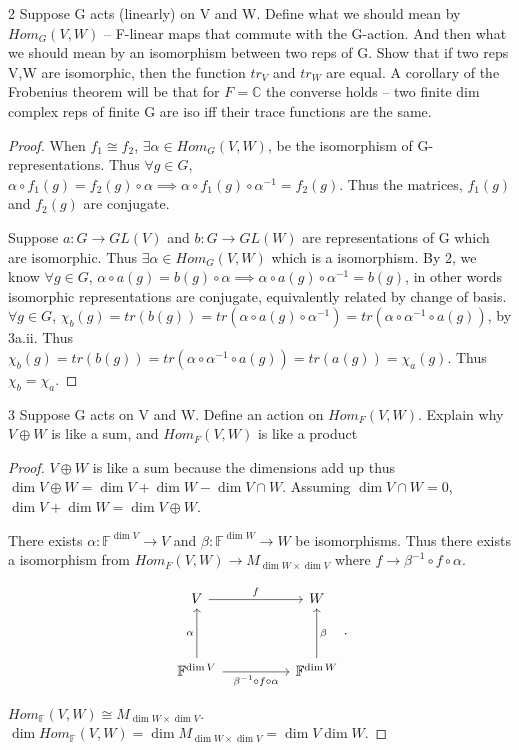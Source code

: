 \documentclass{article}
\newcommand{\C}{\mathbb{C}}
\newcommand{\F}{\mathbb{F}}
\begin{document}
\bigskip

\begin{PROB}{2}\label{Problem 2.}
    Suppose G acts (linearly) on V and W. Define what we should mean by $Hom_G(V,W)$ -- F-linear maps that commute with the G-action. And then what we should mean by an isomorphism between two reps of G. Show that if two reps V,W are isomorphic, then the function $tr_V$ and $tr_W$ are equal.  A corollary of the Frobenius theorem will be that for $F =\C$ the converse holds -- two finite dim complex reps of finite G are iso iff their trace functions are the same. 
\end{PROB}
\begin{proof}
    When $f_1 \cong f_2$,  $\exists \alpha \in Hom_G(V, W)$, be the isomorphism of G-representations. Thus $\forall g \in G$, $\alpha \circ f_1(g) = f_2(g) \circ \alpha \implies \alpha \circ f_1(g) \circ \alpha^{-1} = f_2(g)$. Thus the matrices, $f_1(g)$ and $f_2(g)$ are conjugate.

    Suppose $a: G \to GL(V)$ and $b: G \to GL(W)$ are representations of G which are isomorphic. Thus $\exists \alpha \in Hom_G(V, W)$ which is a isomorphism. By 2, we know $\forall g \in G$, $\alpha \circ a(g) = b(g) \circ \alpha \implies \alpha \circ a(g) \circ \alpha^{-1} = b(g)$, in other words isomorphic representations are conjugate, equivalently related by change of basis. $\forall g \in G$, $\chi_b(g) = tr(b(g)) = tr(\alpha \circ a(g) \circ \alpha^{-1})= tr(\alpha \circ \alpha^{-1} \circ a(g))$, by 3a.ii. Thus $\chi_b(g) =tr(b(g))= tr(\alpha \circ \alpha^{-1} \circ a(g)) = tr(a(g)) = \chi_a(g)$. Thus $\chi_b = \chi_a$.
\end{proof}

\bigskip

\begin{PROB}{3}\label{Problem 3.}
    Suppose G acts on V and W. Define an action on $Hom_F(V,W)$. Explain why $V \oplus W$ is like a sum, and $Hom_F(V,W)$ is like a product
\end{PROB}
\begin{proof}
    $V \oplus W$ is like a sum because the dimensions add up thus $\dim V \oplus W = \dim V + \dim W - \dim V \cap W$. Assuming $\dim V \cap W = 0$, $\dim V + \dim W = \dim V \oplus W$.

    There exists $\alpha: \F^{\dim V} \to V$ and $\beta: \F^{\dim W} \to W$ be isomorphisms. Thus there exists a isomorphism from $Hom_F(V, W) \to M_{\dim W \times \dim V}$ where $f \to \beta^{-1} \circ f \circ \alpha$.
    
    \[\begin{tikzcd}
        V && W \\
        \\
        {\mathbb{F}^{\dim V}} && {\mathbb{F}^{\dim{W}}}
        \arrow["\alpha", from=3-1, to=1-1]
        \arrow["f", from=1-1, to=1-3]
        \arrow["\beta"', from=3-3, to=1-3]
        \arrow["{\beta^{-1} \circ f \circ \alpha}"', from=3-1, to=3-3]
    \end{tikzcd}.\]

    $Hom_{\mathbb{F}}(V, W) \cong M_{\dim W \times \dim V}$. $\dim Hom_{\mathbb{F}}(V, W) = \dim M_{\dim W \times \dim V} = \dim V \dim W$. 
\end{proof}
\end{document}

